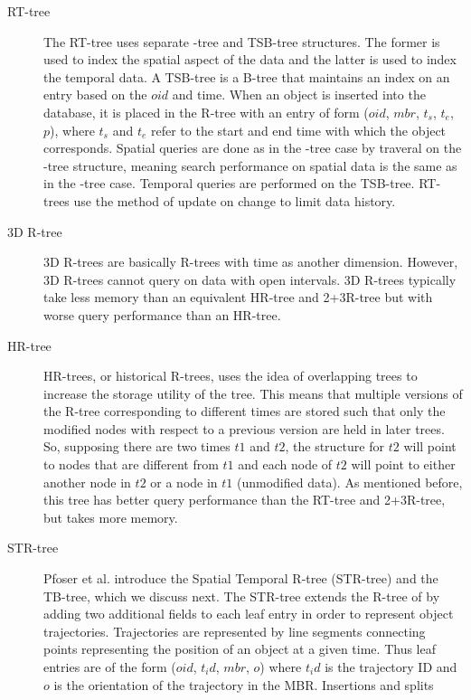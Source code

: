 \begin{description}
	\item[RT-tree] The RT-tree\cite{xu1990rt} uses separate \rbase-tree and 
	TSB-tree structures. The former is used 
	to index the spatial aspect of the data and the latter is used to index
	the temporal data. A TSB-tree is a B-tree that maintains an index on an 
	entry based on the $oid$ and time. When an object is inserted into the 
	database, it is placed in the R-tree with an entry of form 
	($oid$, $mbr$, $t_s$, $t_e$, $p$), where $t_s$ and $t_e$ refer to the 
	start and end time with which the object corresponds. Spatial queries 
	are done as in the \rbase-tree case by traveral on the \rbase-tree 
	structure, meaning search performance on spatial data is the same as in 
	the \rbase-tree case. Temporal queries are performed on the TSB-tree. 
	RT-trees use the method of update on change to limit data history.
	\item[3D R-tree] 3D R-trees \cite{nascimento1999evaluation} are basically
	R-trees with time as another dimension. However, 3D R-trees cannot 
	query on data with open intervals. 3D R-trees typically take less
	memory than an equivalent HR-tree and 2+3R-tree but with worse query 
	performance than an HR-tree.
	\item[HR-tree] HR-trees, or historical R-trees, 
	\cite{nascimento1999evaluation} uses the idea of overlapping trees to 
	increase the storage utility of the tree. This means that multiple 
	versions of the R-tree corresponding to different times are stored such 
	that only the modified nodes with respect to a previous version are 
	held in later trees. So, supposing there are two times $t1$ and $t2$, the
	structure for $t2$ will point to nodes that are different from $t1$ and
	each node of $t2$ will point to either another node in $t2$ or a node in
	$t1$ (unmodified data). As mentioned before, this tree has better query
	performance than the RT-tree and 2+3R-tree, but takes more memory.
	\item[STR-tree] Pfoser et al. introduce the Spatial Temporal R-tree 
	(STR-tree) and the TB-tree, which we discuss next\cite{pfoser2000novel}. 
	The STR-tree extends the R-tree of \cite{guttman84} by adding two additional
	fields to each leaf entry in order to represent object trajectories. 
	Trajectories are represented by line segments connecting points representing
	the position of an object at a given time. Thus leaf entries are of the 
	form ($oid$, $t_id$, $mbr$, $o$) where $t_id$ is the trajectory ID and $o$ 
	is the orientation of the trajectory in the MBR. Insertions and splits 

\end{description}
